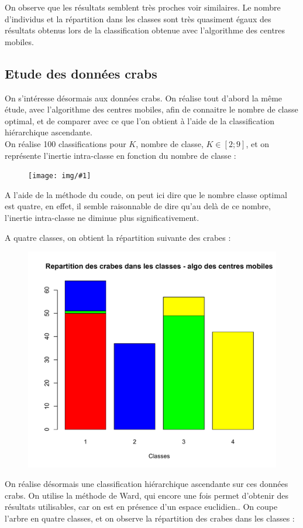 \documentclass[a4paper,11pt]{article}
\newcommand{\InsertFig}[1]{
\begin{figure}[H]
\begin{center}
\texttt{[image: img/\#1]}
\end{center}
\end{figure}}
\begin{document}
\noindent On observe que les résultats semblent très proches voir similaires. Le nombre d'individus et la répartition dans les classes sont très quasiment égaux des résultats obtenus lors de la classification obtenue avec l'algorithme des centres mobiles.

\subsection{Etude des données crabs}

\noindent On s'intéresse désormais aux données crabs. On réalise tout d'abord la même étude, avec l'algorithme des centres mobiles, afin de connaitre le nombre de classe optimal, et de comparer avec ce que l'on obtient à l'aide de la classification hiérarchique ascendante.\\

\noindent On réalise 100 classifications pour $K$, nombre de classe, $K \in [2;9]$, et on représente l'inertie intra-classe en fonction du nombre de classe : 

\InsertFig{coudecrabs}

\noindent A l'aide de la méthode du coude, on peut ici dire que le nombre classe optimal est quatre, en effet, il semble raisonnable de dire qu'au delà de ce nombre, l'inertie intra-classe ne diminue plus significativement.

\noindent A quatre classes, on obtient la répartition suivante des crabes : 

\begin{figure}[H]
\begin{center}
\includegraphics[width=.55\textwidth]{img/crabscm}
\end{center}
\end{figure}

\noindent On réalise désormais une classification hiérarchique ascendante sur ces données crabs. On utilise la méthode de Ward, qui encore une fois permet d'obtenir des résultats utilisables, car on est en présence d'un espace euclidien.. On coupe l'arbre en quatre classes, et on observe la répartition des crabes dans les classes : 
\end{document}
